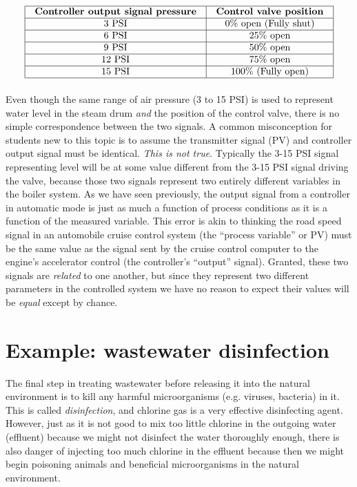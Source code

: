 $$\vbox{\offinterlineskip
\halign{\strut
\vrule \quad\hfil # \ \hfil & 
\vrule \quad\hfil # \ \hfil \vrule \cr
\noalign{\hrule}
%
\textbf{Controller output signal pressure} & \textbf{Control valve position} \cr
%
\noalign{\hrule}
%
3 PSI & 0\% open (Fully shut) \cr
%
\noalign{\hrule}
%
6 PSI & 25\% open \cr
%
\noalign{\hrule}
%
9 PSI & 50\% open \cr
%
\noalign{\hrule}
%
12 PSI & 75\% open \cr
%
\noalign{\hrule}
%
15 PSI & 100\% (Fully open) \cr
%
\noalign{\hrule}
} %
}$$ %

Even though the same range of air pressure (3 to 15 PSI) is used to represent water level in the steam drum \textit{and} the position of the control valve, there is no simple correspondence between the two signals.  A common misconception for students new to this topic is to assume the transmitter signal (PV) and controller output signal must be identical.  \textit{This is not true}.  Typically the 3-15 PSI signal representing level will be at some value different from the 3-15 PSI signal driving the valve, because those two signals represent two entirely different variables in the boiler system.  As we have seen previously, the output signal from a controller in automatic mode is just as much a function of process conditions as it is a function of the measured variable.  This error is akin to thinking the road speed signal in an automobile cruise control system (the ``process variable'' or PV) must be the same value as the signal sent by the cruise control computer to the engine's accelerator control (the controller's ``output'' signal).  Granted, these two signals are \textit{related} to one another, but since they represent two different parameters in the controlled system we have no reason to expect their values will be \textit{equal} except by chance.





\filbreak
\section{Example: wastewater disinfection} 

The final step in treating wastewater before releasing it into the natural environment is to kill any harmful microorganisms (e.g. viruses, bacteria) in it.  This is called \textit{disinfection}, and chlorine gas is a very effective disinfecting agent.  However, just as it is not good to mix too little chlorine in the outgoing water (effluent) because we might not disinfect the water thoroughly enough, there is also danger of injecting too much chlorine in the effluent because then we might begin poisoning animals and beneficial microorganisms in the natural environment. 

